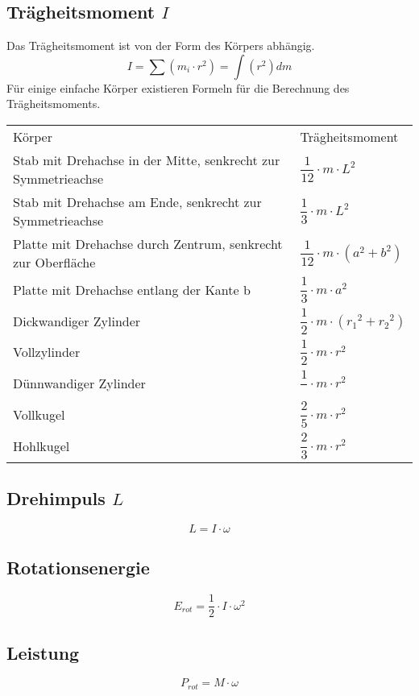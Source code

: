 \subsection{Trägheitsmoment $I$}
Das Trägheitsmoment ist von der Form des Körpers abhängig. 
\[ I = \sum (m_i \cdot r^2) = \int(r^2)dm\]
Für einige einfache Körper existieren Formeln für die Berechnung des 
Trägheitsmoments. 
\begin{table}[h!]
\begin{tabular}{p{}l}
\rowcolor{lgray}
Körper 
& Trägheitsmoment \\

\rowcolor{white}
Stab mit Drehachse in der Mitte, senkrecht zur Symmetrieachse 
& $\dfrac{1}{12} \cdot m \cdot L^2$ \\

\rowcolor{lgray}
Stab mit Drehachse am Ende, senkrecht zur Symmetrieachse 
& $\dfrac{1}{3} \cdot m \cdot L^2$ \\

\rowcolor{white}
Platte mit Drehachse durch Zentrum, senkrecht zur Oberfläche
& $\dfrac{1}{12} \cdot m \cdot (a^2 + b^2)$ \\

\rowcolor{lgray}
Platte mit Drehachse entlang der Kante b
& $\dfrac{1}{3} \cdot m \cdot a^2$ \\

\rowcolor{white}
Dickwandiger Zylinder
& $\dfrac{1}{2} \cdot m \cdot ({r_1}^2 + {r_2}^2)$ \\

\rowcolor{lgray}
Vollzylinder
& $\dfrac{1}{2} \cdot m \cdot r^2$ \\

\rowcolor{white}
Dünnwandiger Zylinder
& $\dfrac{1}{} \cdot m \cdot r^2$ \\

\rowcolor{lgray}
Vollkugel
& $\dfrac{2}{5} \cdot m \cdot r^2$ \\

\rowcolor{white}
Hohlkugel
& $\dfrac{2}{3} \cdot m \cdot r^2$ \\
\end{tabular}
\end{table}

\subsection{Drehimpuls $L$}
\[ L = I \cdot \omega \]

\subsection{Rotationsenergie}
\[ E_{rot} = \frac{1}{2} \cdot I \cdot \omega^2 \]

\subsection{Leistung}
\[ P_{rot} = M \cdot \omega \]
